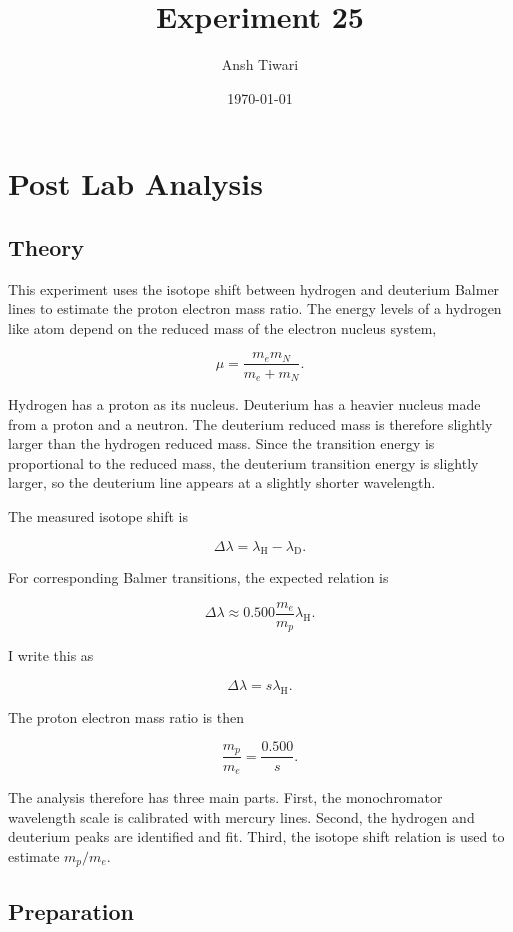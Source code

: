 \documentclass[11pt]{article}
\title{Experiment 25}
\author{Ansh Tiwari}
\date{\today}
\begin{document}
\maketitle

\section{Post Lab Analysis}

\subsection{Theory}

This experiment uses the isotope shift between hydrogen and deuterium Balmer lines to estimate the proton electron mass ratio. The energy levels of a hydrogen like atom depend on the reduced mass of the electron nucleus system,

\[
\mu = \frac{m_e m_N}{m_e + m_N}.
\]

Hydrogen has a proton as its nucleus. Deuterium has a heavier nucleus made from a proton and a neutron. The deuterium reduced mass is therefore slightly larger than the hydrogen reduced mass. Since the transition energy is proportional to the reduced mass, the deuterium transition energy is slightly larger, so the deuterium line appears at a slightly shorter wavelength.

The measured isotope shift is

\[
\Delta \lambda = \lambda_{\mathrm{H}} - \lambda_{\mathrm{D}}.
\]

For corresponding Balmer transitions, the expected relation is

\[
\Delta \lambda
\approx
0.500 \frac{m_e}{m_p} \lambda_{\mathrm{H}}.
\]

I write this as

\[
\Delta \lambda = s \lambda_{\mathrm{H}}.
\]

The proton electron mass ratio is then

\[
\frac{m_p}{m_e} = \frac{0.500}{s}.
\]

The analysis therefore has three main parts. First, the monochromator wavelength scale is calibrated with mercury lines. Second, the hydrogen and deuterium peaks are identified and fit. Third, the isotope shift relation is used to estimate \(m_p/m_e\).

\subsection{Preparation}
\end{document}
